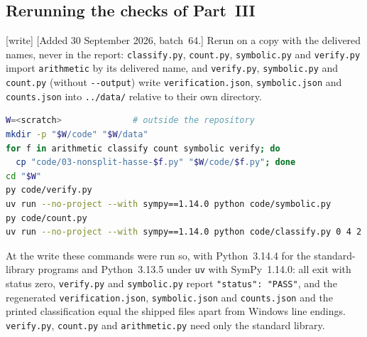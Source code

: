 \documentclass[11pt]{article}
\numberwithin{equation}{section}
\theoremstyle{plain}
\theoremstyle{plain}
\theoremstyle{plain}
\theoremstyle{definition}
\theoremstyle{definition}
\theoremstyle{definition}
\theoremstyle{remark}
\newcommand{\wtag}{\textup{[write]}}%
\newcommand{\rpath}[1]{\nolinkurl{#1}}
\begin{document}
\subsection{Rerunning the checks of Part~III}\label{alg:ns:app:rerun}
\wtag{} [Added 30 September 2026, batch~64.] Rerun on a copy with the
delivered names, never in the report: \texttt{classify.py},
\texttt{count.py}, \texttt{symbolic.py} and \texttt{verify.py} import
\texttt{arithmetic} by its delivered name, and \texttt{verify.py},
\texttt{symbolic.py} and \texttt{count.py} (without \texttt{-{}-output})
write \texttt{verification.json}, \texttt{symbolic.json} and
\texttt{counts.json} into \rpath{../data/} relative to their own
directory.
\begin{lstlisting}[language=bash]
W=<scratch>              # outside the repository
mkdir -p "$W/code" "$W/data"
for f in arithmetic classify count symbolic verify; do
  cp "code/03-nonsplit-hasse-$f.py" "$W/code/$f.py"; done
cd "$W"
py code/verify.py
uv run --no-project --with sympy==1.14.0 python code/symbolic.py
py code/count.py
uv run --no-project --with sympy==1.14.0 python code/classify.py 0 4 2
\end{lstlisting}
At the write these commands were run so, with Python~3.14.4 for the
standard-library programs and Python~3.13.5 under \texttt{uv} with
SymPy~1.14.0: all exit with status zero, \texttt{verify.py} and
\texttt{symbolic.py} report \texttt{"status": "PASS"}, and the
regenerated \texttt{verification.json}, \texttt{symbolic.json} and
\texttt{counts.json} and the printed classification equal the shipped
files apart from Windows line endings. \texttt{verify.py},
\texttt{count.py} and \texttt{arithmetic.py} need only the standard
library.
\end{document}
